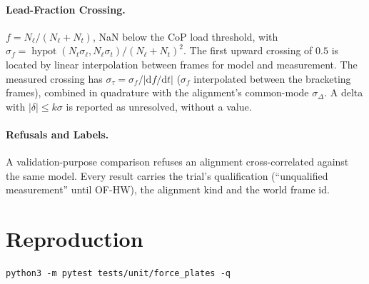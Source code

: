 \documentclass[11pt]{article}
\begin{document}
\paragraph{Lead-Fraction Crossing.} $f = N_\ell/(N_\ell + N_t)$, NaN below the
CoP load threshold, with
$\sigma_f = \operatorname{hypot}(N_t\sigma_\ell, N_\ell\sigma_t)/(N_\ell+N_t)^2$.
The first upward crossing of $0.5$ is located by linear interpolation between
frames for model and measurement. The measured crossing has
$\sigma_\tau = \sigma_f/|\mathrm{d}f/\mathrm{d}t|$ ($\sigma_f$ interpolated
between the bracketing frames), combined in quadrature with the alignment's
common-mode $\sigma_\Delta$. A delta with $|\delta| \le k\sigma$ is reported as
unresolved, without a value.

\paragraph{Refusals and Labels.} A validation-purpose comparison refuses an
alignment cross-correlated against the same model. Every result carries the
trial's qualification (``unqualified measurement'' until OF-HW), the
alignment kind and the world frame id.

\section{Reproduction}

\begin{verbatim}
python3 -m pytest tests/unit/force_plates -q
\end{verbatim}
\end{document}
